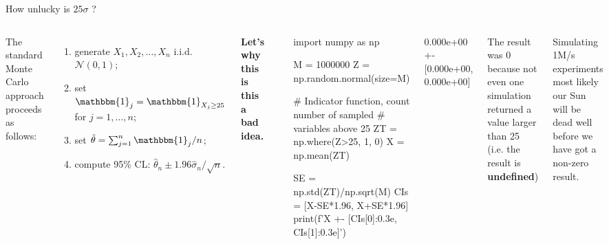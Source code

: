 \documentclass{beamer}
\begin{document}
\begin{frame}[fragile]{How unlucky is $25\sigma$ ?}
\begin{columns}
The standard Monte Carlo approach proceeds as follows:
\begin{enumerate}
	\item generate $X_1, X_2, \ldots ,X_n$ i.i.d. $\mathcal{N}(0,1)$;
	\item set $\mathbbm{1}_j=\mathbbm{1}_{X_j\geq 25}$ for $j=1,\ldots ,n$;
	\item set $\hat{\theta}=\sum_{j=1}^n \mathbbm{1}_j/n$;
	\item compute 95\% CL: $\hat{\theta}_n\pm 1.96\hat{\sigma}_n/\sqrt{n}$.
\end{enumerate}
\small{\textbf{Let's why this is this a bad idea.}}%
\begin{center}
	\includegraphics[width=0.6\linewidth]{images/25_sigmas}
\end{center}
\begin{ipython}
import numpy as np
	
M = 1000000
Z = np.random.normal(size=M)

# Indicator function, count number of sampled 
# variables above 25
ZT = np.where(Z>25, 1, 0)
X = np.mean(ZT)
	
SE = np.std(ZT)/np.sqrt(M)
CIs = [X-SE*1.96, X+SE*1.96]
print(f'{X} +- [{CIs[0]:0.3e}, {CIs[1]:0.3e}]')	
\end{ipython}
\begin{ioutput}
	
0.000e+00 +- [0.000e+00, 0.000e+00]	
\end{ioutput}
\small{
The result was 0 because not even one simulation returned a value larger than 25 (i.e. the result is \textbf{undefined})

Simulating 1M/s experiments most likely our Sun will be dead well before we have got a non-zero result.}
\end{columns}
\end{frame}
\end{document}
